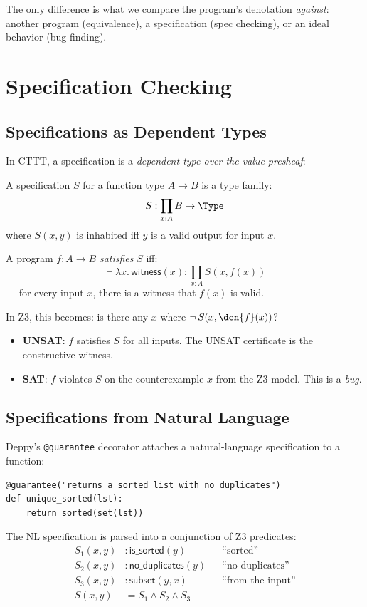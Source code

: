 The only difference is what we compare the program's denotation
\emph{against}: another program (equivalence), a specification
(spec checking), or an ideal behavior (bug finding).


\chapter{Specification Checking}
\label{ch:spec-checking}

\section{Specifications as Dependent Types}

In CTTT, a specification is a \emph{dependent type over the value
presheaf}:

\begin{definition}[Specification]
A specification $S$ for a function type $A \to B$ is a type family:
\[
  S : \prod_{x : A} B \to \Type
\]
where $S(x, y)$ is inhabited iff $y$ is a valid output for input $x$.
\end{definition}

A program $f : A \to B$ \emph{satisfies} $S$ iff:
\[
  \vdash \lambda x.\, \mathsf{witness}(x) :
  \prod_{x : A} S(x, f(x))
\]
--- for every input $x$, there is a witness that $f(x)$ is valid.

In Z3, this becomes: is there any $x$ where $\lnot\,S(x, \den{f}(x))$?
\begin{itemize}
  \item \textbf{UNSAT}: $f$ satisfies $S$ for all inputs.
    The UNSAT certificate is the constructive witness.
  \item \textbf{SAT}: $f$ violates $S$ on the counterexample $x$
    from the Z3 model.  This is a \emph{bug}.
\end{itemize}

\section{Specifications from Natural Language}

Deppy's \texttt{@guarantee} decorator attaches a natural-language
specification to a function:
\begin{lstlisting}
@guarantee("returns a sorted list with no duplicates")
def unique_sorted(lst):
    return sorted(set(lst))
\end{lstlisting}

The NL specification is parsed into a conjunction of Z3 predicates:
\begin{align}
  S_1(x, y) &: \mathsf{is\_sorted}(y)
    && \text{``sorted''} \\
  S_2(x, y) &: \mathsf{no\_duplicates}(y)
    && \text{``no duplicates''} \\
  S_3(x, y) &: \mathsf{subset}(y, x)
    && \text{``from the input''} \\
  S(x, y) &= S_1 \land S_2 \land S_3
\end{align}


